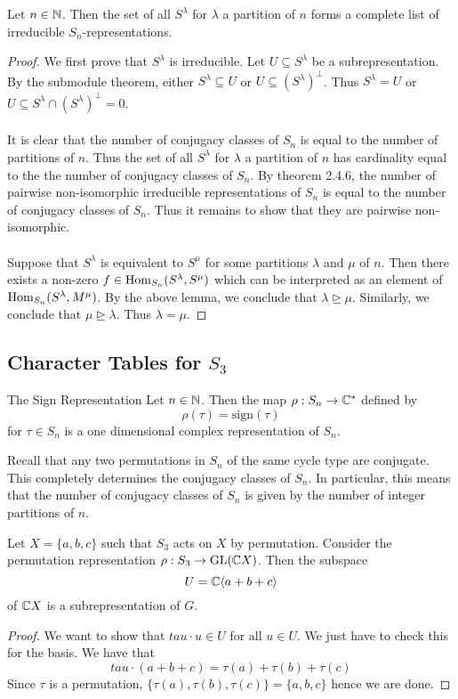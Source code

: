 \documentclass[a4paper]{article}
\begin{document}
\begin{thm}{}{} Let $n\in\mathbb{N}$. Then the set of all $S^\lambda$ for $\lambda$ a partition of $n$ forms a complete list of irreducible $S_n$-representations. \tcbline
\begin{proof}
We first prove that $S^\lambda$ is irreducible. Let $U\subseteq S^\lambda$ be a subrepresentation. By the submodule theorem, either $S^\lambda\subseteq U$ or $U\subseteq(S^\lambda)^\perp$. Thus $S^\lambda=U$ or $U\subseteq S^\lambda\cap(S^\lambda)^\perp=0$. \\~\\

It is clear that the number of conjugacy classes of $S_n$ is equal to the number of partitions of $n$. Thus the set of all $S^\lambda$ for $\lambda$ a partition of $n$ has cardinality equal to the the number of conjugacy classes of $S_n$. By theorem 2.4.6, the number of pairwise non-isomorphic irreducible representations of $S_n$ is equal to the number of conjugacy classes of $S_n$. Thus it remains to show that they are pairwise non-isomorphic. \\~\\

Suppose that $S^\lambda$ is equivalent to $S^\mu$ for some partitions $\lambda$ and $\mu$ of $n$. Then there exists a non-zero $f\in\operatorname{Hom}_{S_n}(S^\lambda,S^\mu)$ which can be interpreted as an element of $\operatorname{Hom}_{S_n}(S^\lambda,M^\mu)$. By the above lemma, we conclude that $\lambda\trianglerighteq\mu$. Similarly, we conclude that $\mu\trianglerighteq\lambda$. Thus $\lambda=\mu$. 
\end{proof}
\end{thm}

\subsection{Character Tables for $S_3$}
\begin{prp}{The Sign Representation}{} Let $n\in\mathbb{N}$. Then the map $\rho:S_n\to\mathbb{C}^\ast$ defined by $$\rho(\tau)=\text{sign}(\tau)$$ for $\tau\in S_n$ is a one dimensional complex representation of $S_n$. 
\end{prp}

Recall that any two permutations in $S_n$ of the same cycle type are conjugate. This completely determines the conjugacy classes of $S_n$. In particular, this means that the number of conjugacy classes of $S_n$ is given by the number of integer partitions of $n$. 

\begin{prp}{}{} Let $X=\{a,b,c\}$ such that $S_3$ acts on $X$ by permutation. Consider the permutation representation $\rho:S_3\to\text{GL}(\mathbb{C} X)$. Then the subspace $$U=\mathbb{C}\langle a+b+c\rangle$$ of $\mathbb{C} X$ is a subrepresentation of $G$. \tcbline
\begin{proof}
We want to show that $tau\cdot u\in U$ for all $u\in U$. We just have to check this for the basis. We have that $$tau\cdot(a+b+c)=\tau(a)+\tau(b)+\tau(c)$$ Since $\tau$ is a permutation, $\{\tau(a),\tau(b),\tau(c)\}=\{a,b,c\}$ hence we are done. 
\end{proof}
\end{prp}
\end{document}
